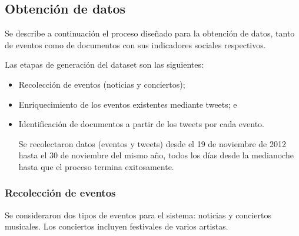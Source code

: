 \documentclass[upright, contnum]{umemoria}
\begin{document}
\subsection{Obtención de datos}
\label{sec-4.2.1}

    Se describe a continuación el proceso diseñado para la obtención de
    datos, tanto de eventos como de documentos con sus indicadores
    sociales respectivos.

    Las etapas de generación del dataset son las siguientes:

\begin{itemize}
\item Recolección de eventos (noticias y conciertos);
\item Enriquecimiento de los eventos existentes mediante tweets; e
\item Identificación de documentos a partir de los tweets por cada evento.

      Se recolectaron datos (eventos y tweets) desde el 19 de noviembre de
      2012 hasta el 30 de noviembre del mismo año, todos los días
      desde la medianoche hasta que el proceso termina exitosamente.
\end{itemize}
\subsubsection{Recolección de eventos}

Se consideraron dos tipos de eventos para el sistema: noticias y
conciertos musicales. Los conciertos incluyen festivales de varios
artistas.
\end{document}
